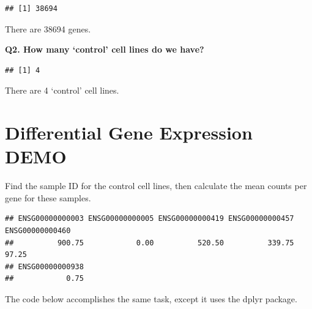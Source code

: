 \documentclass[
]{article}
\newenvironment{Shaded}{\begin{snugshade}}{\end{snugshade}}
\newcommand{\DecValTok}[1]{\textcolor[rgb]{0.00,0.00,0.81}{#1}}
\newcommand{\FunctionTok}[1]{\textcolor[rgb]{0.00,0.00,0.00}{#1}}
\newcommand{\NormalTok}[1]{#1}
\newcommand{\OtherTok}[1]{\textcolor[rgb]{0.56,0.35,0.01}{#1}}
\newcommand{\SpecialCharTok}[1]{\textcolor[rgb]{0.00,0.00,0.00}{#1}}
\newcommand{\StringTok}[1]{\textcolor[rgb]{0.31,0.60,0.02}{#1}}
\begin{document}
\begin{verbatim}
## [1] 38694
\end{verbatim}

There are 38694 genes.

\textbf{Q2. How many `control' cell lines do we have?}

\begin{Shaded}
\end{Shaded}

\begin{verbatim}
## [1] 4
\end{verbatim}

There are 4 `control' cell lines.

\hypertarget{differential-gene-expression-demo}{%
\section{Differential Gene Expression
DEMO}\label{differential-gene-expression-demo}}

Find the sample ID for the control cell lines, then calculate the mean
counts per gene for these samples.

\begin{Shaded}
\end{Shaded}

\begin{verbatim}
## ENSG00000000003 ENSG00000000005 ENSG00000000419 ENSG00000000457 ENSG00000000460 
##          900.75            0.00          520.50          339.75           97.25 
## ENSG00000000938 
##            0.75
\end{verbatim}

The code below accomplishes the same task, except it uses the dplyr
package.
\end{document}
